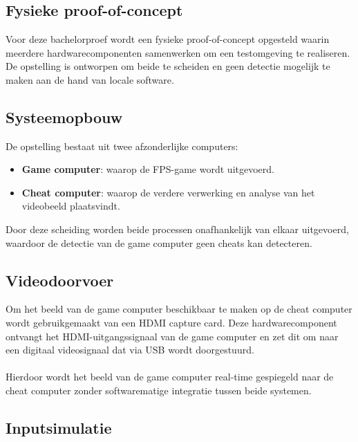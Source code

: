 \chapter{}
\label{ch:Fysieke-proof-of-concept}

\section{Fysieke proof-of-concept}

Voor deze bachelorproef wordt een fysieke proof-of-concept opgesteld waarin meerdere hardwarecomponenten samenwerken om een testomgeving te realiseren. De opstelling is ontworpen om beide te scheiden en geen detectie mogelijk te maken aan de hand van locale software.

\section{Systeemopbouw}

De opstelling bestaat uit twee afzonderlijke computers:

\begin{itemize}
    \item \textbf{Game computer}: waarop de FPS-game wordt uitgevoerd.
    \item \textbf{Cheat computer}: waarop de verdere verwerking en analyse van het videobeeld plaatsvindt.
\end{itemize}

Door deze scheiding worden beide processen onafhankelijk van elkaar uitgevoerd, waardoor de detectie van de game computer geen cheats kan detecteren.

\section{Videodoorvoer}

Om het beeld van de game computer beschikbaar te maken op de cheat computer wordt gebruikgemaakt van een HDMI capture card. Deze hardwarecomponent ontvangt het HDMI-uitgangssignaal van de game computer en zet dit om naar een digitaal videosignaal dat via USB wordt doorgestuurd.
\\\\
Hierdoor wordt het beeld van de game computer real-time gespiegeld naar de cheat computer zonder softwarematige integratie tussen beide systemen.

\section{Inputsimulatie}


